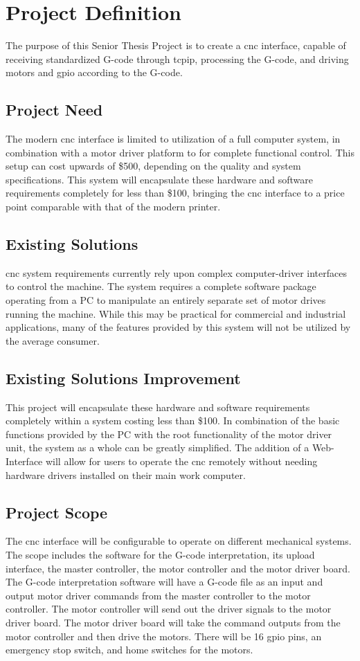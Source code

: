 \chapter{Project Definition}
The purpose of this Senior Thesis Project is to create a \gls{cnc} interface, capable of receiving standardized G-code through \gls{tcpip}, processing the G-code, and driving motors and \gls{gpio} according to the G-code. 

\section{Project Need}
The modern \gls{cnc} interface is limited to utilization of a full computer system, in combination with a motor driver platform to for complete functional control.
This setup can cost upwards of \$500, depending on the quality and system specifications.
This system will encapsulate these hardware and software requirements completely for less than \$100, bringing the \gls{cnc} interface to a price point comparable with that of the modern printer. 

\section{Existing Solutions}
\gls{cnc} system requirements currently rely upon complex computer-driver interfaces to control the machine.
The system requires a complete software package operating from a PC to manipulate an entirely separate set of motor drives running the machine.
While this may be practical for commercial and industrial applications, many of the features provided by this system will not be utilized by the average consumer.

\section{Existing Solutions Improvement}
This project will encapsulate these hardware and software requirements completely within a system costing less than \$100.
In combination of the basic functions provided by the PC with the root functionality of the motor driver unit, the system as a whole can be greatly simplified.
The addition of a Web-Interface will allow for users to operate the \gls{cnc} remotely without needing hardware drivers installed on their main work computer.

\section{Project Scope}
The \gls{cnc} interface will be configurable to operate on different mechanical systems. 
The scope includes the software for the G-code interpretation, its upload interface, the master controller, the motor controller and the motor driver board.
The G-code interpretation software will have a G-code file as an input and output motor driver commands from the master controller to the motor controller.
The motor controller will send out the driver signals to the motor driver board. 
The motor driver board will take the command outputs from the motor controller and then drive the motors. 
There will be 16 \gls{gpio} pins, an emergency stop switch, and home switches for the motors. 

